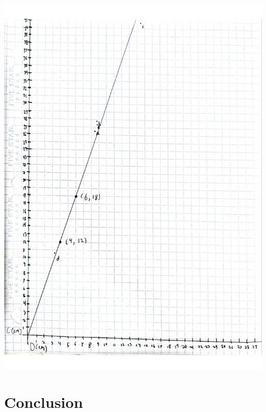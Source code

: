 \documentclass[12pt]{article}
\begin{document}
\includegraphics[scale=0.8]{PiReportGraph}

\pagebreak

\section{Conclusion}
\end{document}

